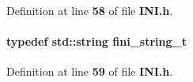 Definition at line {\bf 58} of file {\bf I\+N\+I.\+h}.

\paragraph[{fini\+\_\+string\+\_\+t}]{\setlength{\rightskip}{0pt plus 5cm}typedef {\bf std\+::string} {\bf fini\+\_\+string\+\_\+t}}\label{INI_8h_a38d09ae9d340b15b8580649e578974db}


Definition at line {\bf 59} of file {\bf I\+N\+I.\+h}.

